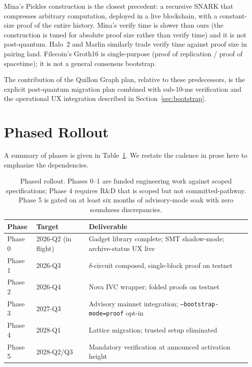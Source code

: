 \documentclass[11pt,a4paper]{article}
\begin{document}
Mina's Pickles construction is the closest precedent: a recursive SNARK
that compresses arbitrary computation, deployed in a live blockchain,
with a constant-size proof of the entire history. Mina's verify time
is slower than ours (the construction is tuned for absolute proof size
rather than verify time) and it is not post-quantum. Halo~2 and Marlin
similarly trade verify time against proof size in pairing land.
Filecoin's Groth16 is single-purpose (proof of replication / proof of
spacetime); it is not a general consensus bootstrap.

The contribution of the Quillon Graph plan, relative to these
predecessors, is the explicit post-quantum migration plan combined
with sub-10-ms verification and the operational UX integration
described in Section~\ref{sec:bootstrap}.

\section{Phased Rollout}
\label{sec:rollout}

A summary of phases is given in Table~\ref{tab:phases}. We restate
the cadence in prose here to emphasize the dependencies.

\begin{table}[h]
\centering
\small
\begin{tabularx}{\linewidth}{l l X}
\toprule
\textbf{Phase} & \textbf{Target} & \textbf{Deliverable} \\
\midrule
Phase 0  & 2026-Q2 (in flight) & Gadget library complete; SMT shadow-mode; archive-status UX live \\
Phase 1  & 2026-Q3 & $\delta$-circuit composed, single-block proof on testnet \\
Phase 2  & 2026-Q4 & Nova IVC wrapper; folded proofs on testnet \\
Phase 3  & 2027-Q3 & Advisory mainnet integration; \texttt{--bootstrap-mode=proof} opt-in \\
Phase 4  & 2028-Q1 & Lattice migration; trusted setup eliminated \\
Phase 5  & 2028-Q2/Q3 & Mandatory verification at announced activation height \\
\bottomrule
\end{tabularx}
\caption{Phased rollout. Phases 0--1 are funded engineering work
against scoped specifications; Phase 4 requires R\&D that is
scoped but not committed-pathway. Phase 5 is gated on at least
six months of advisory-mode soak with zero soundness discrepancies.}
\label{tab:phases}
\end{table}
\end{document}
